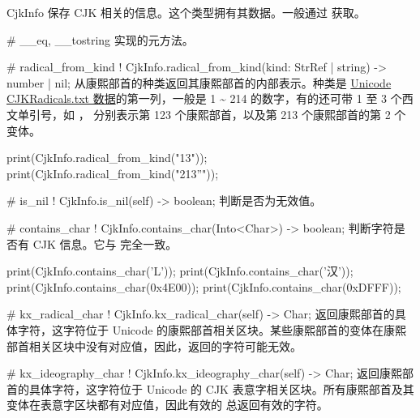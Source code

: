 \documentclass[class=article,doc={kv-usage}]{cusdoc}
\begin{document}
\begin{luadoc}[global]{CjkInfo}
保存 CJK 相关的信息。这个类型拥有其数据。一般通过  获取。
\end{luadoc}

\begin{luadoc*}{}
# __eq, __tostring
实现的元方法。
\end{luadoc*}

\begin{luadoc*}{}
# radical_from_kind
! CjkInfo.radical_from_kind(kind: StrRef | string) -> number | nil;
从康熙部首的种类返回其康熙部首的内部表示。种类是 \href{https://www.unicode.org/Public/UCD/latest/ucd/CJKRadicals.txt}{Unicode CJKRadicals.txt 数据}的第一列，一般是 1 \~{} 214 的数字，有的还可带 1 至 3 个西文单引号，如 ， 分别表示第 123 个康熙部首，以及第 213 个康熙部首的第 2 个变体。
\end{luadoc*}

\begin{luarun}{}
print(CjkInfo.radical_from_kind("13"));
print(CjkInfo.radical_from_kind("213''"));
\end{luarun}

\begin{luadoc*}{}
# is_nil
! CjkInfo.is_nil(self) -> boolean;
判断是否为无效值。
\end{luadoc*}

\begin{luadoc*}{}
# contains_char
! CjkInfo.contains_char(Into<Char>) -> boolean;
判断字符是否有 CJK 信息。它与  完全一致。
\end{luadoc*}

\begin{luarun}{}
print(CjkInfo.contains_char('L'));
print(CjkInfo.contains_char('汉'));
print(CjkInfo.contains_char(0x4E00));
print(CjkInfo.contains_char(0xDFFF));
\end{luarun}

\begin{luadoc*}{}
# kx_radical_char
! CjkInfo.kx_radical_char(self) -> Char;
返回康熙部首的具体字符，这字符位于 Unicode 的康熙部首相关区块。某些康熙部首的变体在康熙部首相关区块中没有对应值，因此，返回的字符可能无效。
\end{luadoc*}

\begin{luadoc*}{}
# kx_ideography_char
! CjkInfo.kx_ideography_char(self) -> Char;
返回康熙部首的具体字符，这字符位于 Unicode 的 CJK 表意字相关区块。所有康熙部首及其变体在表意字区块都有对应值，因此有效的  总返回有效的字符。
\end{luadoc*}
\end{document}
